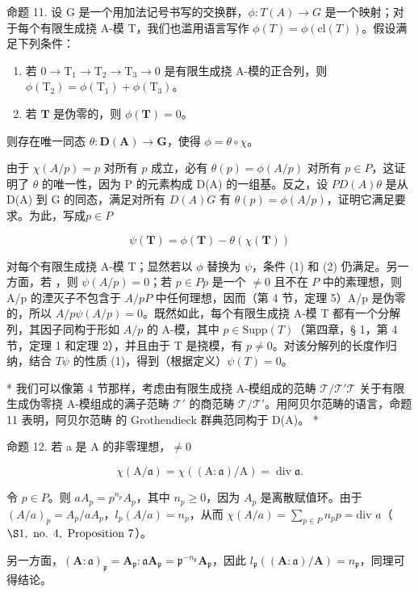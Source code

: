 命题 11. 设 G 是一个用加法记号书写的交换群，\(\phi: T(A) \to G\) 是一个映射；对于每个有限生成挠 A-模 T，我们也滥用语言写作 \(\phi(T) = \phi(\text{cl}(T))\)。假设满足下列条件：

\begin{enumerate}
\def\labelenumi{(\arabic{enumi})}
\item
  若 \(0 \to \mathrm{T}_1 \to \mathrm{T}_2 \to \mathrm{T}_3 \to 0\) 是有限生成挠 A-模的正合列，则 \(\phi(\mathrm{T}_2) = \phi(\mathrm{T}_1) + \phi(\mathrm{T}_3)\)。
\item
  若 \(\mathbf{T}\) 是伪零的，则 \(\phi (\mathbf{T}) = 0\)。
\end{enumerate}

则存在唯一同态 \(\theta: \mathbf{D}(\mathbf{A}) \to \mathbf{G}\)，使得 \(\phi = \theta \circ \chi\)。

由于 \(\chi(A/p) = p\) 对所有 \(p\) 成立，必有 \(\theta(p) = \phi(A/p)\) 对所有 \(p \in P\)，这证明了 \(\theta\) 的唯一性，因为 P 的元素构成 D(A) 的一组基。反之，设 \(P\)\(D(A)\)\(\theta\) 是从 D(A) 到 G 的同态，满足对所有 \(D(A)\)\(G\) 有 \(\theta(p) = \phi(A/p)\)，证明它满足要求。为此，写成\(p \in P\)

\[
\psi (\mathbf {T}) = \phi (\mathbf {T}) - \theta (\chi (\mathbf {T}))
\]

对每个有限生成挠 A-模 T；显然若以 \(\phi\) 替换为 \(\psi\)，条件 (1) 和 (2) 仍满足。另一方面，若 ，则 \(\psi(A/p) = 0\)；若 \(p \in P\)\(p\) 是一个 \(\neq 0\) 且不在 \(P\) 中的素理想，则 A/p 的湮灭子不包含于 \(A/p\)\(P\) 中任何理想，因而（第 4 节，定理 5）A/p 是伪零的，所以 \(A/p\)\(\psi(A/p) = 0\)。既然如此，每个有限生成挠 A-模 T 都有一个分解列，其因子同构于形如 \(A/p\) 的 A-模，其中 \(p \in \text{Supp}(T)\)（第四章，§ 1，第 4 节，定理 1 和定理 2），并且由于 T 是挠模，有 \(p \neq 0\)。对该分解列的长度作归纳，结合 \(T\)\(\psi\) 的性质 (1)，得到（根据定义）\(\psi(T) = 0\)。

* 我们可以像第 4 节那样，考虑由有限生成挠 A-模组成的范畴 \(\mathcal{T} / \mathcal{T}'\)\(\mathcal{T}\) 关于有限生成伪零挠 A-模组成的满子范畴 \(\mathcal{T}'\) 的商范畴 \(\mathcal{T} / \mathcal{T}'\)。用阿贝尔范畴的语言，命题 11 表明，阿贝尔范畴  的 Grothendieck 群典范同构于 D(A)。 *

命题 12. 若 a 是 A 的非零理想，\(\neq 0\)

\[
\chi (\mathrm{A} / \mathfrak {a}) = \chi ((\mathrm{A}: \mathfrak {a}) / \mathrm{A}) = \operatorname{div} \mathfrak {a}.
\]

令 \(p \in P\)。则 \(aA_p = p^{n_p}A_p\)，其中 \(n_p \geqslant 0\)，因为 \(A_p\) 是离散赋值环。由于 \((A/a)_p = A_p/aA_p\)，\(l_p(A/a) = n_p\)，从而 \(\chi(A/a) = \sum_{p \in P} n_p p = \text{div } a\)（\(\S 1, \text{ no. } 4, \text{ Proposition } 7\)）。

另一方面，\((\mathbf{A}:\mathfrak{a})_{\mathfrak{p}} = \mathbf{A}_{\mathfrak{p}}\colon \mathfrak{a}\mathbf{A}_{\mathfrak{p}} = \mathfrak{p}^{-n_{\mathfrak{p}}}\mathbf{A}_{\mathfrak{p}}\)，因此 \(l_{\mathfrak{p}}((\mathbf{A}:\mathfrak{a}) / \mathbf{A}) = n_{\mathfrak{p}}\)，同理可得结论。

